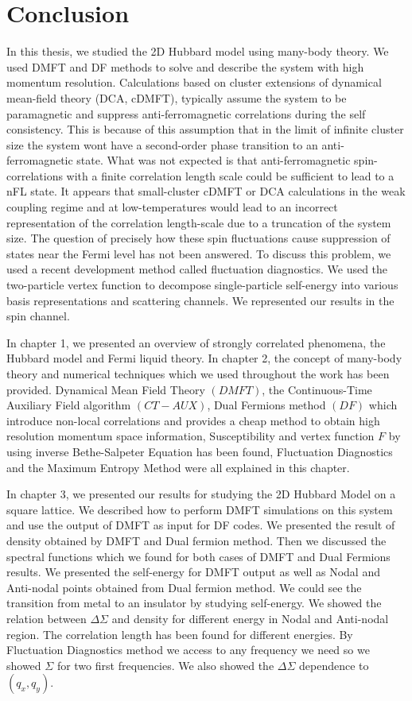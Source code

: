 \chapter{Conclusion}

In this thesis, we studied the 2D Hubbard model using many-body theory. We used DMFT and DF methods to solve and describe the system with high momentum resolution. Calculations based on cluster extensions of dynamical mean-field theory (DCA, cDMFT), typically assume the system to be paramagnetic and suppress anti-ferromagnetic correlations during the self consistency. This is because of this assumption that in the limit of infinite cluster size the system wont have a second-order phase transition to an anti-ferromagnetic state. What was not expected is that anti-ferromagnetic spin-correlations with a finite correlation length scale could be sufficient to lead to a nFL state. It appears that small-cluster cDMFT or DCA calculations in the weak coupling regime and at low-temperatures would lead to an incorrect representation of the correlation length-scale due to a truncation of the system size. The question of precisely how these spin fluctuations cause suppression of states near the
Fermi level has not been answered. To discuss this problem, we used a recent development method called fluctuation diagnostics. We used the two-particle vertex function to decompose single-particle self-energy into various basis representations and scattering channels. We represented our results in the spin channel. 

In chapter 1, we presented an overview of strongly correlated phenomena, the Hubbard model and Fermi liquid theory. In chapter 2, the concept of many-body theory and numerical techniques which we used throughout the work has been provided. Dynamical Mean Field Theory $(DMFT)$, the Continuous-Time Auxiliary Field algorithm $(CT-AUX)$, Dual Fermions method $(DF)$ which introduce non-local correlations and provides a cheap method to obtain high resolution momentum space information, Susceptibility and vertex function $F$ by using inverse Bethe-Salpeter Equation has been found, Fluctuation Diagnostics and the Maximum Entropy Method were all explained in this chapter.

In chapter 3, we presented our results for studying the 2D Hubbard Model on a square lattice. We described how to perform DMFT simulations on this system and use the output of DMFT as input for DF codes. We presented the result of density obtained by DMFT and Dual fermion method. Then we discussed the spectral functions which we found for both cases of DMFT and Dual Fermions results. We presented the self-energy for DMFT output as well as Nodal and Anti-nodal points obtained from Dual fermion method. We could see the transition from metal to an insulator by studying self-energy. We showed the relation between $\Delta\Sigma$ and density for different energy in Nodal and Anti-nodal region. The correlation length has been found for different energies. By Fluctuation Diagnostics method we access to any frequency we need so we showed $\Sigma$ for two first frequencies. We also showed the $\Delta \Sigma$ dependence to $(q_x, q_y)$.

